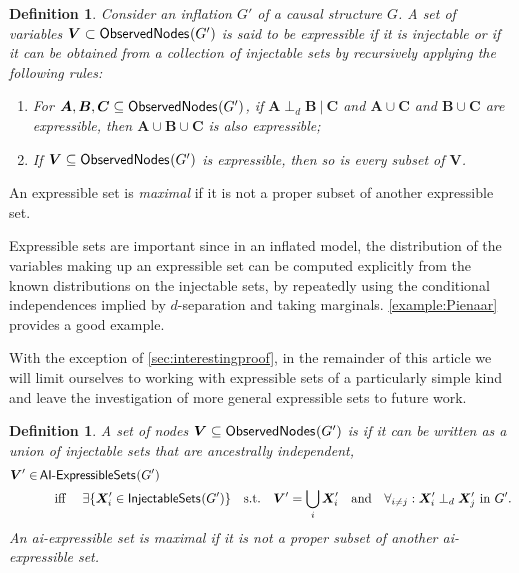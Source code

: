 \documentclass[aps,english,10pt,superscriptaddress,onecolumn,twoside,longbibliography,pra,floatfix,fleqn,nofootinbib]{revtex4-1}
\newcommand*{\tblue}[1]{{\color{medblue}{\textbf{#1}}}}
\newtheorem{definition}[theorem]{Definition}
\theoremstyle{definition}
\newcounter{example}[section]
\newcommand{\SmallNamedFunction}[3][]{\operatorname{\mathsf{#2}}_{#1}\parenths{#3}}
\newcommand{\obsnodes}[1]{\SmallNamedFunction{ObservedNodes}{#1}}
\newcommand{\aindep}{\ensuremath{\perp_d}}
\DeclarePairedDelimiter{\parenths}{\lparen}{\rparen}
\begin{document}
\begin{definition}\label{def:expressible}
Consider an inflation $G'$ of a causal structure $G$.  A set of variables $\bm{V} \subset \obsnodes{G'}$ is said to be {\em expressible} if it is injectable or if it can be obtained from a collection of injectable sets by recursively applying the following rules:
\begin{enumerate}
\item For $\bm{A},\bm{B},\bm{C}\subseteq\obsnodes{G'}$, if $\bm{A}\aindep \bm{B}\:|\:\bm{C}$ and $\bm{A} \cup \bm{C}$ and $\bm{B} \cup \bm{C}$ are expressible, then $\bm{A}\cup \bm{B}\cup \bm{C}$ is also expressible;
\item If $\bm{V}\subseteq\obsnodes{G'}$ is expressible, then so is every subset of $\bm{V}$.
\end{enumerate}
\end{definition}
An expressible set is \emph{maximal} if it is not a proper subset of another expressible set.


Expressible sets are important since in an inflated model, the distribution of the variables making up an expressible set can be computed explicitly from the known distributions on the injectable sets, by repeatedly using the conditional independences implied by $d$-separation and taking marginals. \cref{example:Pienaar} provides a good example.

With the exception of \cref{sec:interestingproof}, in the remainder of this article we will limit ourselves to working with expressible sets of a particularly simple kind and leave the investigation of more general expressible sets to future work.

\begin{definition}
A set of nodes $\bm{V}\subseteq\obsnodes{G'}$ is \tblue{ai-expressible} if it can be written as a union of injectable sets that are ancestrally independent,
\begin{align}\label{eq:defpreinj}
\begin{split}
\bm{V}'\in & \SmallNamedFunction{AI-ExpressibleSets}{G'} \\
	& \quad\text{ iff }\quad  \exists \{ \bm{X}'_i \in \SmallNamedFunction{InjectableSets}{G'} \} \quad \text{s.t.}\quad \bm{V}'=\bigcup_i \bm{X}'_i  \quad\text{and} \quad  \forall_{i\ne j}: \bm{X}'_i \aindep \bm{X}'_j \text{ in }G'.
\end{split}
\end{align}
An ai-expressible set is \emph{maximal} if it is not a proper subset of another ai-expressible set.
\end{definition}
\end{document}
